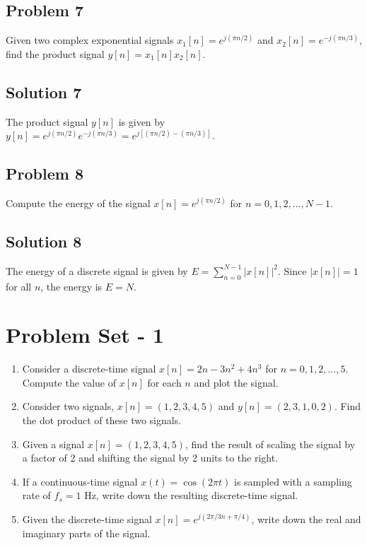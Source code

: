 \documentclass[11pt]{article}
\begin{document}
\subsection*{Problem 7}
Given two complex exponential signals $x_1[n] = e^{j(\pi n/2)}$ and $x_2[n] = e^{-j(\pi n/3)}$, find the product signal $y[n] = x_1[n]x_2[n]$.

\subsection*{Solution 7}
The product signal $y[n]$ is given by $y[n] = e^{j(\pi n/2)}e^{-j(\pi n/3)} = e^{j[(\pi n/2) - (\pi n/3)]}$.

\subsection*{Problem 8}
Compute the energy of the signal $x[n] = e^{j(\pi n/2)}$ for $n = 0, 1, 2, ..., N-1$.

\subsection*{Solution 8}
The energy of a discrete signal is given by $E = \sum_{n=0}^{N-1}|x[n]|^2$. Since $|x[n]| = 1$ for all $n$, the energy is $E = N$.


\newpage

\section*{Problem Set - 1}

\begin{enumerate}
\item Consider a discrete-time signal $x[n] = 2n - 3n^2 + 4n^3$ for $n=0,1,2,...,5$. Compute the value of $x[n]$ for each $n$ and plot the signal.


\item Consider two signals, $x[n] = (1, 2, 3, 4, 5)$ and $y[n] = (2, 3, 1, 0, 2)$. Find the dot product of these two signals.

\item Given a signal $x[n] = (1, 2, 3, 4, 5)$, find the result of scaling the signal by a factor of 2 and shifting the signal by 2 units to the right.


\item If a continuous-time signal $x(t) = \cos(2\pi t)$ is sampled with a sampling rate of $f_s = 1$ Hz, write down the resulting discrete-time signal.

\item Given the discrete-time signal $x[n] = e^{j(2\pi/3 n + \pi/4)}$, write down the real and imaginary parts of the signal.

\end{enumerate}
\end{document}
